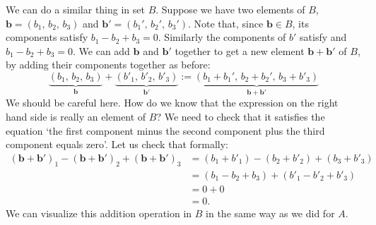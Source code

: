 \documentclass[a4paper,11pt]{book}
\theoremstyle{definition}
\newcommand{\be}{\begin{equation}}
\newcommand{\ee}{\end{equation}}
\newcommand{\ve}[1]{\mathbf{#1}}
\begin{document}
We can do a similar thing in set $B$. Suppose we have two elements of $B$, $\ve{b} = (b_1, \,b_2, \,b_3)$ and $\ve{b}' = (b_1', \, b_2', \, b_3')$. Note that, since $\ve{b}\in B$, its components satisfy $b_1 - b_2 + b_3 = 0$. Similarly the components of $b'$ satisfy and $b_1 - b_2 + b_3 = 0$. We can add $\ve{b}$ and $\ve{b}'$ together to get a new element $\ve{b} + \ve{b}'$ of $B$, by adding their components together as before:
\be \label{new_add_in_B}
 \underbrace{(b_1, \, b_2, \, b_3)}_{\ve{b}} + \underbrace{(b'_1, \,b'_2, \, b'_3)}_{\ve{b}'} := \underbrace{(b_1 + b_1', \, b_2 + b_2', \, b_3 + b'_3)}_{\ve{b} + \ve{b}'}
\ee
We should be careful here. How do we know that the expression on the right hand side is really an element of $B$? We need to check that it satisfies the equation `the first component minus the second component plus the third component equals zero'. Let us check that formally:
\begin{align*}
 (\ve{b} + \ve{b}')_1 - (\ve{b}+\ve{b}')_2 + (\ve{b}+\ve{b}')_3 &= (b_1 + b'_1) - (b_2 + b'_2) + (b_3 + b'_3) \\
 &= (b_1 - b_2 + b_3) + (b'_1 - b'_2 + b'_3) \\
 &= 0 + 0 \\
 &= 0.
\end{align*}
We can visualize this addition operation in $B$ in the same way as we did for $A$.
\end{document}
